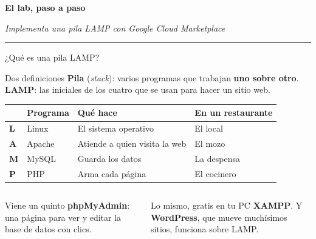 \documentclass[aspectratio=169,10pt,c]{beamer}
\newcommand{\separador}[2]{%
\begin{frame}[plain]
\vfill
\begin{center}
{\fontsize{29}{34}\selectfont\bfseries #1}\par
\vspace{2mm}
{\small #2}\par
\vspace{4mm}
{\color{utpRojo}\rule{8.5cm}{1.2pt}}
\end{center}
\vfill
\end{frame}}
\begin{document}
\separador{El lab, paso a paso}{\emph{Implementa una pila LAMP con Google Cloud Marketplace}}

\begin{frame}{¿Qué es una pila LAMP?}
\begin{block}{Dos definiciones}
\small \textbf{Pila} (\emph{stack}): varios programas que trabajan \textbf{uno sobre otro}. \textbf{LAMP}: las iniciales de los cuatro que se usan para hacer un sitio web.
\end{block}
\renewcommand{\arraystretch}{1.25}
\centering\small
\begin{tabular}{@{}p{0.9cm}p{2.6cm}p{4.2cm}p{4.9cm}@{}}
\toprule
 & \textbf{Programa} & \textbf{Qué hace} & \textbf{En un restaurante}\\
\midrule
\textbf{L} & Linux & El sistema operativo & El local\\
\textbf{A} & Apache & Atiende a quien visita la web & El mozo\\
\textbf{M} & MySQL & Guarda los datos & La despensa\\
\textbf{P} & PHP & Arma cada página & El cocinero\\
\bottomrule
\end{tabular}
\par\vspace{2mm}
\begin{columns}[T,onlytextwidth]
\begin{exampleblock}{Viene un quinto}
\small \textbf{phpMyAdmin}: una página para ver y editar la base de datos con clics.
\end{exampleblock}
\begin{alertblock}{Lo mismo, gratis en tu PC}
\small \textbf{XAMPP}. Y \textbf{WordPress}, que mueve muchísimos sitios, funciona sobre LAMP.
\end{alertblock}
\end{columns}
\end{frame}
\end{document}

